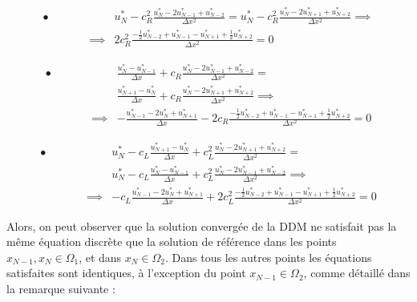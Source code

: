 \begin{equation*}
    \label{eq:TBCsCVOmega1A}
\begin{aligned}
   \bullet \qquad && 			    &u_N^* - c_R^2 \frac{u_N^* - 2u_{N-1}^* + u_{N-2}^*}{\Delta x^2} = u_N^* - c_R^2 \frac{u_N^* - 2u_{N+1}^* + u_{N+2}^*}{\Delta x^2} \implies  \\
    && \implies & 2c_R^2 \frac{-\frac{1}{2}u_{N-2}^* + u_{N-1}^* - u_{N+1}^* + \frac{1}{2}u_{N+2}^* }{\Delta x^2} = 0
    \end{aligned}
    \end{equation*}
    
\begin{equation*}
    \label{eq:TBCsCVOmega1B}
\begin{aligned}
    \bullet \qquad &&             &\frac{u_N^* - u_{N-1}^*}{\Delta x} + c_R \frac{u_N^* - 2u_{N-1}^* + u_{N-2}^*}{\Delta x^2} = \\
    && 			   &\frac{u_{N+1}^* - u_{N}^*}{\Delta x} + c_R \frac{u_N^* - 2u_{N+1}^* + u_{N+2}^*}{\Delta x^2} \implies \\
    && \implies & -\frac{u_{N-1}^* - 2 u_{N}^* + u_{N+1}^*}{\Delta x} - 2c_R\frac{-\frac{1}{2}u_{N-2}^* + u_{N-1}^* - u_{N+1}^* + \frac{1}{2}u_{N+2}^* }{\Delta x^2} = 0 
\end{aligned}
\end{equation*}

\begin{equation*}
    \label{eq:TBCsCVOmega2}
\begin{aligned}
   \bullet \qquad && 					&	 u_N^* -  c_L\frac{u_{N+1}^* - u_{N}^*}{\Delta x} + c_L^2 \frac{u_{N}^* - 2u_{N+1}^* + u_{N+2}^*}{\Delta x^2} =  \\
   && 					& u_N^* -  c_L\frac{u_{N}^* - u_{N-1}^*}{\Delta x} + c_L^2 \frac{u_{N}^* - 2u_{N-1}^* + u_{N-2}^*}{\Delta x^2} \implies \\
	&&  \implies	    & -c_L\frac{u_{N-1}^* - 2 u_{N}^* + u_{N+1}^*}{\Delta x} + 2c_L^2\frac{-\frac{1}{2}u_{N-2}^* + u_{N-1}^* - u_{N+1}^* + \frac{1}{2}u_{N+2}^* }{\Delta x^2} = 0 
\end{aligned}
\end{equation*}

\indent Alors, on peut observer que la solution convergée de la DDM ne satisfait pas la même équation discrète que la solution de référence dans les points $x_{N-1}, x_N \in \Omega_1$, et dans $x_N\in \Omega_2$. Dans tous les autres points les équations satisfaites sont identiques, à l'exception du point $x_{N-1} \in \Omega_2$, comme détaillé dans la remarque suivante :

